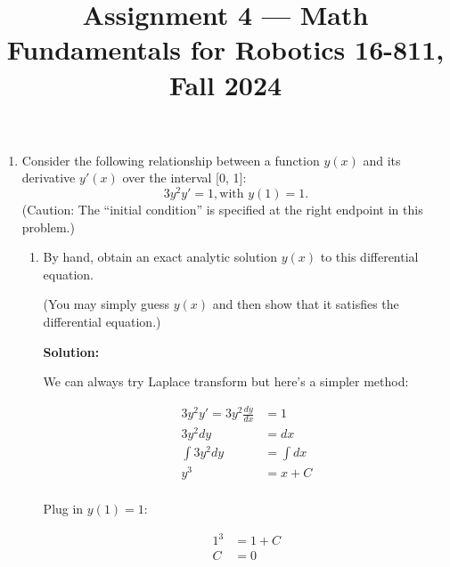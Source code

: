 \documentclass[conference,onecolumn]{IEEEtran}
\begin{document}
\title{\Large Assignment 4 --- Math Fundamentals for Robotics 16-811, Fall 2024}

\author{
}

\maketitle

\begin{enumerate}
      \item Consider the following relationship between a function $y(x)$ and its derivative $y'(x)$ over the interval [0, 1]:
            $$
                  3 y^2 y' = 1, \text{with } y(1) = 1.
            $$
            (Caution: The “initial condition” is specified at the right endpoint in this problem.)

            \begin{enumerate}
                  \item By hand, obtain an exact analytic solution $y(x)$ to this differential equation.

                        (You may simply guess $y(x)$ and then show that it satisfies the differential equation.)

                        \textbf{Solution:}

                        We can always try Laplace transform but here's a simpler method:

                        \begin{align*}
                              3 y^2 y' = 3 y^2 \frac{dy}{dx} & = 1       \\
                              3 y^2 dy                       & = dx      \\
                              \int 3 y^2 dy                  & = \int dx \\
                              y^3                            & = x + C   \\
                        \end{align*}

                        Plug in $y(1) = 1$:

                        \begin{align*}
                              1^3 & = 1 + C \\
                              C   & = 0
                        \end{align*}


\end{enumerate}
\end{enumerate}
\end{document}
